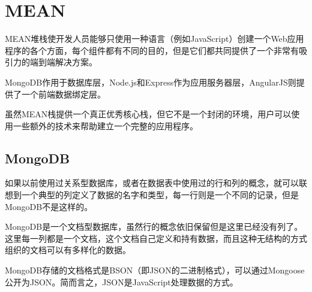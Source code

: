 \begin{lstlisting}[language=bash]

\end{lstlisting}



\begin{lstlisting}[language=bash]

\end{lstlisting}




\begin{lstlisting}[language=bash]

\end{lstlisting}



\begin{lstlisting}[language=bash]

\end{lstlisting}






\chapter{MEAN}



MEAN堆栈使开发人员能够只使用一种语言（例如JavaScript）创建一个Web应用程序的各个方面，每个组件都有不同的目的，但是它们都共同提供了一个非常有吸引力的端到端解决方案。

MongoDB作用于数据库层，Node.js和Express作为应用服务器层，AngularJS则提供了一个前端数据绑定层。

虽然MEAN栈提供一个真正优秀核心栈，但它不是一个封闭的环境，用户可以使用一些额外的技术来帮助建立一个完整的应用程序。


\section{MongoDB}

如果以前使用过关系型数据库，或者在数据表中使用过的行和列的概念，就可以联想到一个典型的列定义了数据的名字和类型，每一行则是一个不同的记录，但是MongoDB不是这样的。

MongoDB是一个文档型数据库，虽然行的概念依旧保留但是这里已经没有列了。这里每一列都是一个文档，这个文档自己定义和持有数据，而且这种无结构的方式组织的文档可以有多样化的数据。

MongoDB存储的文档格式是BSON（即JSON的二进制格式），可以通过Mongoose公开为JSON。简而言之，JSON是JavaScript处理数据的方式。

